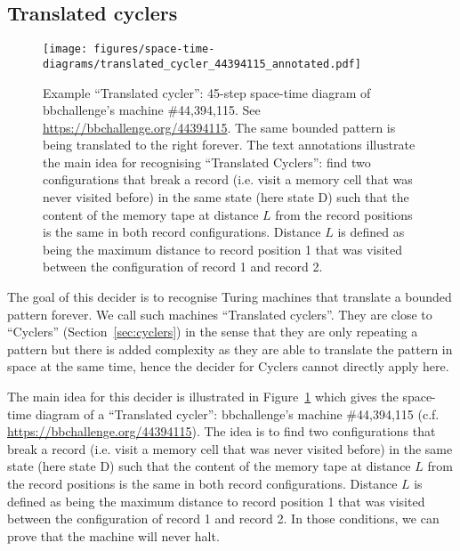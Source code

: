
\newpage
\subsection{Translated cyclers}\label{sec:translated-cyclers}

\begin{figure}[h!]
  \centering
  \texttt{[image: figures/space-time-diagrams/translated\_cycler\_44394115\_annotated.pdf]}

  \caption{Example ``Translated cycler'': 45-step space-time diagram of bbchallenge's machine \#44,394,115. See \url{https://bbchallenge.org/44394115}. The same bounded pattern is being translated to the right forever. The text annotations illustrate the main idea for recognising ``Translated Cyclers'': find two configurations that break a record (i.e. visit a memory cell that was never visited before) in the same state (here state \textcolor{colorD}{D}) such that the content of the memory tape at distance $L$ from the record positions is the same in both record configurations. Distance $L$ is defined as being the maximum distance to record position 1 that was visited between the configuration of record 1 and record 2.}\label{fig:translated-cyclers}
\end{figure}

The goal of this decider is to recognise Turing machines that translate a bounded pattern forever. We call such machines ``Translated cyclers''. They are close to ``Cyclers'' (Section~\ref{sec:cyclers}) in the sense that they are only repeating a pattern but there is added complexity as they are able to translate the pattern in space at the same time, hence the decider for Cyclers cannot directly apply here.

The main idea for this decider is illustrated in Figure~\ref{fig:translated-cyclers} which gives the space-time diagram of a ``Translated cycler'': bbchallenge's machine \#44,394,115 (c.f. \url{https://bbchallenge.org/44394115}). The idea is to find two configurations that break a record (i.e. visit a memory cell that was never visited before) in the same state (here state \textcolor{colorD}{D}) such that the content of the memory tape at distance $L$ from the record positions is the same in both record configurations. Distance $L$ is defined as being the maximum distance to record position 1 that was visited between the configuration of record 1 and record 2. In those conditions, we can prove that the machine will never halt.

